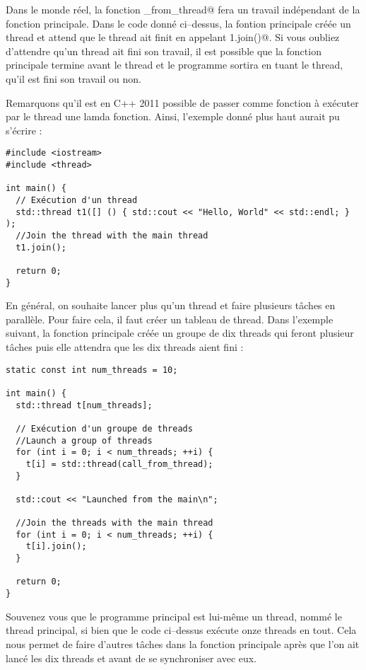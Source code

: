 \documentclass[fleqn,11pt]{article}
\begin{document}
Dans le monde réel, la fonction \lstinline@call_from_thread@ fera un travail indépendant de la fonction principale.
Dans le code donné ci--dessus, la fontion principale créée un thread et attend que le thread ait finit en appelant
\lstinline@t1.join()@. Si vous oubliez d'attendre qu'un thread ait fini son travail, il est possible que la fonction
principale termine avant le thread et le programme sortira en tuant le thread, qu'il est fini son travail ou non.

Remarquons qu'il est en C++ 2011 possible de passer comme fonction à exécuter par le thread une lamda fonction. Ainsi, l'exemple
donné plus haut aurait pu s'écrire :

\begin{lstlisting}
#include <iostream>
#include <thread>

int main() {
  // Exécution d'un thread
  std::thread t1([] () { std::cout << "Hello, World" << std::endl; } );
  //Join the thread with the main thread
  t1.join();

  return 0;
}
\end{lstlisting}

En général, on souhaite lancer plus qu'un thread et faire plusieurs tâches en parallèle. Pour faire cela,
il faut créer un tableau de thread. Dans l'exemple suivant, la fonction principale créée un groupe de dix threads 
qui feront plusieur tâches puis elle attendra que les dix threads aient fini :

\begin{lstlisting}
static const int num_threads = 10;

int main() {
  std::thread t[num_threads];

  // Exécution d'un groupe de threads
  //Launch a group of threads
  for (int i = 0; i < num_threads; ++i) {
    t[i] = std::thread(call_from_thread);
  }

  std::cout << "Launched from the main\n";

  //Join the threads with the main thread
  for (int i = 0; i < num_threads; ++i) {
    t[i].join();
  }

  return 0;
}
\end{lstlisting}

Souvenez vous que le programme principal est lui-même un thread, nommé le thread principal, si bien que le code
ci--dessus exécute onze threads en tout. Cela nous permet de faire d'autres tâches dans la fonction principale
après que l'on ait lancé les dix threads et avant de se synchroniser avec eux. 
\end{document}
